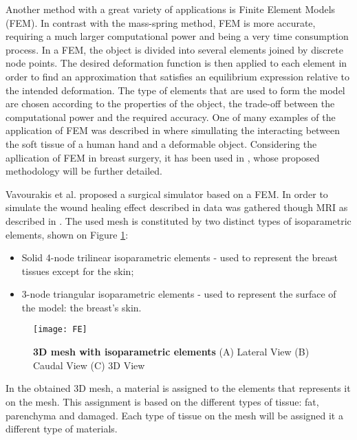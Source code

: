 Another method with a great variety of applications is Finite Element Models (FEM). In contrast with the mass-spring method, FEM is more accurate, requiring a much larger computational power and being a very time consumption process. In a FEM, the object is divided into several elements joined by discrete node points. The desired deformation function is then applied to each element in order to find an approximation that satisfies an equilibrium expression relative to the intended deformation. The type of elements that are used to form the model are chosen according to the properties of the object, the trade-off between the computational power and the required accuracy. One of many examples of the application of FEM was described in \cite{Kurihara2004} where simullating the interacting between the soft tissue of a human hand and a deformable object. Considering the apllication of FEM in breast surgery, it has been used in \cite{Vavourakis2016}, whose proposed methodology will be further detailed.

\vspace{12mm}

Vavourakis et al. \cite{Vavourakis2016} proposed a surgical simulator based on a FEM. In order to simulate the wound healing effect described in \cite{Vavourakis2016} data was gathered though MRI as described in \cite{apenn}. The used mesh is constituted by two distinct types of isoparametric elements, shown on Figure \ref{fig:3d_mesh}:

\begin{itemize}
\item Solid 4-node trilinear isoparametric elements - used to represent the breast tissues except for the skin;
\item 3-node triangular isoparametric elements - used to represent the surface of the model: the breast's skin.
\end{itemize}

\begin{figure}[H]
\begin{center}
    \leavevmode
    \texttt{[image: FE]}
    \caption[3D mesh with isoparametric elements]{\textbf{3D mesh with isoparametric elements} (A) Lateral View (B) Caudal View (C) 3D View \cite{Vavourakis2016}}
    \label{fig:3d_mesh}
  \end{center}
\end{figure}

In the obtained 3D mesh, a material is assigned to the elements that represents it on the mesh. This assignment is based on the different types of tissue: fat, parenchyma and damaged. Each type of tissue on the mesh will be assigned it a different type of materials.

